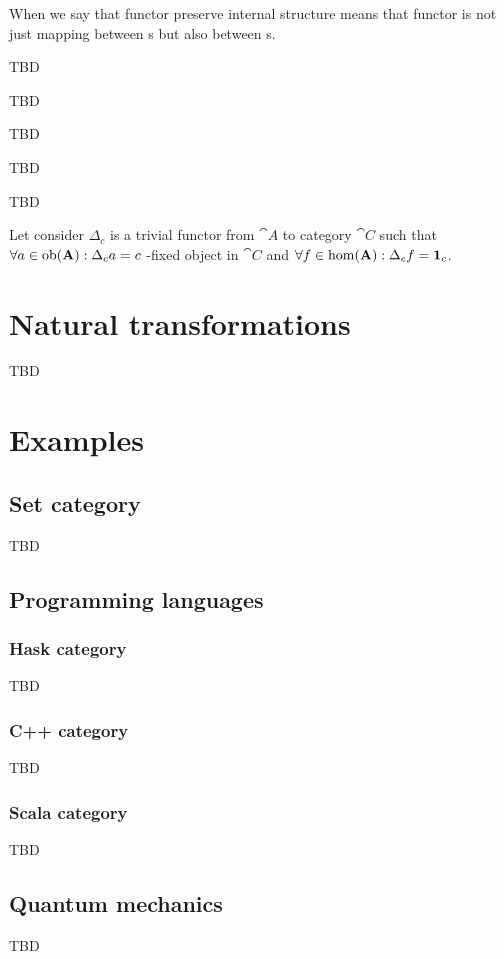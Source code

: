 \begin{remark}[Functor]
When we say that functor preserve internal structure means that
functor is not just mapping between s but also
between s.  
\end{remark}

\begin{definition}
TBD
\end{definition}

\begin{definition}
TBD
\end{definition}

\begin{definition}
TBD
\end{definition}

\begin{definition}
TBD
\end{definition}

\begin{definition}[Bifunctor]
TBD
\end{definition}

\begin{definition}
\label{def:terminal_object_cat}
Let consider $\Delta_c$ is a trivial functor from 
$\cat{A}$ to category $\cat{C}$ such that $\forall a \in \mathrm{ob}(\mathbf{A}):
\Delta_c a = c$ -fixed object in $\cat{C}$ and 
$\forall f \in \mathrm{hom}(\mathbf{A}): \Delta_c f = \mathbf{1}_{c}$.
\end{definition}

\section{Natural transformations}

TBD

\section{Examples}

\subsection{\textbf{Set} category}
TBD

\subsection{Programming languages}

\subsubsection{\textbf{Hask} category}
TBD

\subsubsection{\textbf{C++} category}
TBD

\subsubsection{\textbf{Scala} category}
TBD

\subsection{Quantum mechanics}
TBD
